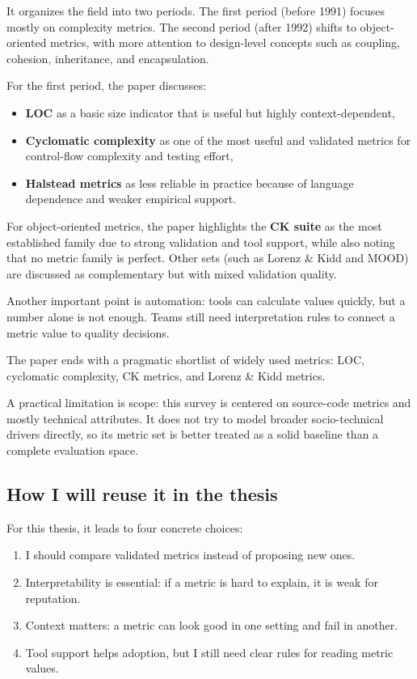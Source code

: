 \documentclass[11pt,a4paper]{article}
\begin{document}
It organizes the field into two periods. The first period (before 1991) focuses mostly on complexity metrics. The second period (after 1992) shifts to object-oriented metrics, with more attention to design-level concepts such as coupling, cohesion, inheritance, and encapsulation.

For the first period, the paper discusses:
\begin{itemize}[leftmargin=*]
  \item \textbf{LOC} as a basic size indicator that is useful but highly context-dependent,
  \item \textbf{Cyclomatic complexity} as one of the most useful and validated metrics for control-flow complexity and testing effort,
  \item \textbf{Halstead metrics} as less reliable in practice because of language dependence and weaker empirical support.
\end{itemize}

For object-oriented metrics, the paper highlights the \textbf{CK suite} as the most established family due to strong validation and tool support, while also noting that no metric family is perfect. Other sets (such as Lorenz \& Kidd and MOOD) are discussed as complementary but with mixed validation quality.

Another important point is automation: tools can calculate values quickly, but a number alone is not enough. Teams still need interpretation rules to connect a metric value to quality decisions.

The paper ends with a pragmatic shortlist of widely used metrics: LOC, cyclomatic complexity, CK metrics, and Lorenz \& Kidd metrics.

A practical limitation is scope: this survey is centered on source-code metrics and mostly technical attributes. It does not try to model broader socio-technical drivers directly, so its metric set is better treated as a solid baseline than a complete evaluation space.

\subsection{How I will reuse it in the thesis}
For this thesis, it leads to four concrete choices:
\begin{enumerate}[leftmargin=*]
  \item I should compare validated metrics instead of proposing new ones.
  \item Interpretability is essential: if a metric is hard to explain, it is weak for reputation.
  \item Context matters: a metric can look good in one setting and fail in another.
  \item Tool support helps adoption, but I still need clear rules for reading metric values.
\end{enumerate}
\end{document}
